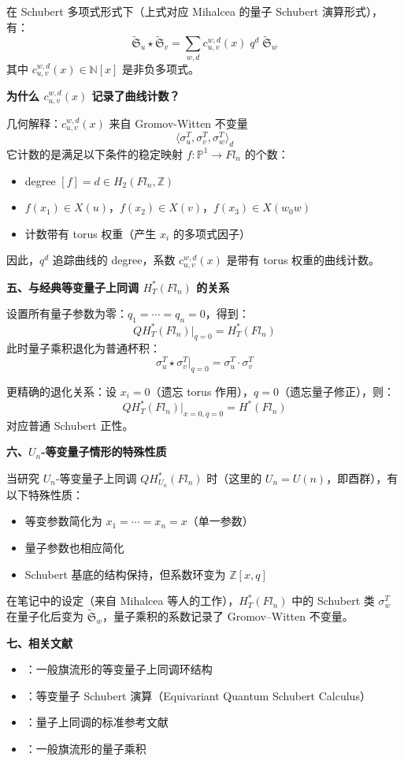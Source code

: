 在 Schubert 多项式形式下（上式对应 Mihalcea 的量子 Schubert 演算形式），有：
$$\widetilde{\mathfrak{S}}_u \star \widetilde{\mathfrak{S}}_v = \sum_{w, d} c_{u,v}^{w,d}(x) \; q^d \; \widetilde{\mathfrak{S}}_w$$
其中 $c_{u,v}^{w,d}(x) \in \mathbb{N}[x]$ 是非负多项式。

\textbf{为什么 $c_{u,v}^{w,d}(x)$ 记录了曲线计数？}

几何解释：$c_{u,v}^{w,d}(x)$ 来自 Gromov-Witten 不变量
$$\langle \sigma_u^T, \sigma_v^T, \sigma_w^T \rangle_d$$
它计数的是满足以下条件的稳定映射 $f: \mathbb{P}^1 \to Fl_n$ 的个数：
\begin{itemize}
\item degree $[f] = d \in H_2(Fl_n, \mathbb{Z})$
\item $f(x_1) \in X(u)$，$f(x_2) \in X(v)$，$f(x_3) \in X(w_0w)$
\item 计数带有 torus 权重（产生 $x_i$ 的多项式因子）
\end{itemize}
因此，$q^d$ 追踪曲线的 degree，系数 $c_{u,v}^{w,d}(x)$ 是带有 torus 权重的曲线计数。

\textbf{五、与经典等变量子上同调 $H_T^*(Fl_n)$ 的关系}

设置所有量子参数为零：$q_1 = \cdots = q_n = 0$，得到：
$$QH_T^*(Fl_n) \big|_{q=0} = H_T^*(Fl_n)$$
此时量子乘积退化为普通杯积：
$$\sigma_u^T \star \sigma_v^T \big|_{q=0} = \sigma_u^T \cdot \sigma_v^T$$

更精确的退化关系：设 $x_i = 0$（遗忘 torus 作用），$q = 0$（遗忘量子修正），则：
$$QH_T^*(Fl_n) \big|_{x=0, q=0} = H^*(Fl_n)$$
对应普通 Schubert 正性。

\textbf{六、$U_n$-等变量子情形的特殊性质}

当研究 $U_n$-等变量子上同调 $QH_{U_n}^*(Fl_n)$ 时（这里的 $U_n = U(n)$，即酉群），有以下特殊性质：

\begin{itemize}
\item 等变参数简化为 $x_1 = \cdots = x_n = x$（单一参数）
\item 量子参数也相应简化
\item Schubert 基底的结构保持，但系数环变为 $\mathbb{Z}[x, q]$
\end{itemize}

在笔记中的设定（来自 Mihalcea 等人的工作），$H_T^*(Fl_n)$ 中的 Schubert 类 $\sigma_w^T$ 在量子化后变为 $\widetilde{\mathfrak{S}}_w$，量子乘积的系数记录了 Gromov--Witten 不变量。

\textbf{七、相关文献}

\begin{itemize}
\item \cite[Section 3]{Kim2000}：一般旗流形的等变量子上同调环结构
\item \cite[Section 2]{Mihalcea}：等变量子 Schubert 演算（Equivariant Quantum Schubert Calculus）
\item \cite[Chapter 10]{FultonQuntum1997}：量子上同调的标准参考文献
\item \cite[Section 1]{CiocanFontanine1997}：一般旗流形的量子乘积
\end{itemize}

